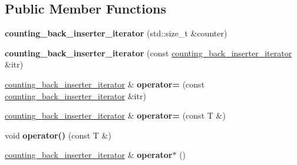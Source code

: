 \subsection*{Public Member Functions}
\begin{DoxyCompactItemize}
\item 
\hypertarget{classstrtk_1_1counting__back__inserter__iterator_a4df285a14db94568615e41201f467777}{{\bfseries counting\-\_\-back\-\_\-inserter\-\_\-iterator} (std\-::size\-\_\-t \&counter)}\label{classstrtk_1_1counting__back__inserter__iterator_a4df285a14db94568615e41201f467777}

\item 
\hypertarget{classstrtk_1_1counting__back__inserter__iterator_abb28251d4c80a93186dbf0367bb78a65}{{\bfseries counting\-\_\-back\-\_\-inserter\-\_\-iterator} (const \hyperlink{classstrtk_1_1counting__back__inserter__iterator}{counting\-\_\-back\-\_\-inserter\-\_\-iterator} \&itr)}\label{classstrtk_1_1counting__back__inserter__iterator_abb28251d4c80a93186dbf0367bb78a65}

\item 
\hypertarget{classstrtk_1_1counting__back__inserter__iterator_a5340c3b04ec8a656b578b3ac7e0ce9fb}{\hyperlink{classstrtk_1_1counting__back__inserter__iterator}{counting\-\_\-back\-\_\-inserter\-\_\-iterator} \& {\bfseries operator=} (const \hyperlink{classstrtk_1_1counting__back__inserter__iterator}{counting\-\_\-back\-\_\-inserter\-\_\-iterator} \&itr)}\label{classstrtk_1_1counting__back__inserter__iterator_a5340c3b04ec8a656b578b3ac7e0ce9fb}

\item 
\hypertarget{classstrtk_1_1counting__back__inserter__iterator_aa7680ffd03f98879227e8e25b53bf586}{\hyperlink{classstrtk_1_1counting__back__inserter__iterator}{counting\-\_\-back\-\_\-inserter\-\_\-iterator} \& {\bfseries operator=} (const T \&)}\label{classstrtk_1_1counting__back__inserter__iterator_aa7680ffd03f98879227e8e25b53bf586}

\item 
\hypertarget{classstrtk_1_1counting__back__inserter__iterator_a02b69e617230b40d8179d3dbd87fc638}{void {\bfseries operator()} (const T \&)}\label{classstrtk_1_1counting__back__inserter__iterator_a02b69e617230b40d8179d3dbd87fc638}

\item 
\hypertarget{classstrtk_1_1counting__back__inserter__iterator_a77078da25b47e7cbb010dac2c7b31d2c}{\hyperlink{classstrtk_1_1counting__back__inserter__iterator}{counting\-\_\-back\-\_\-inserter\-\_\-iterator} \& {\bfseries operator$\ast$} ()}\label{classstrtk_1_1counting__back__inserter__iterator_a77078da25b47e7cbb010dac2c7b31d2c}


\end{DoxyCompactItemize}
